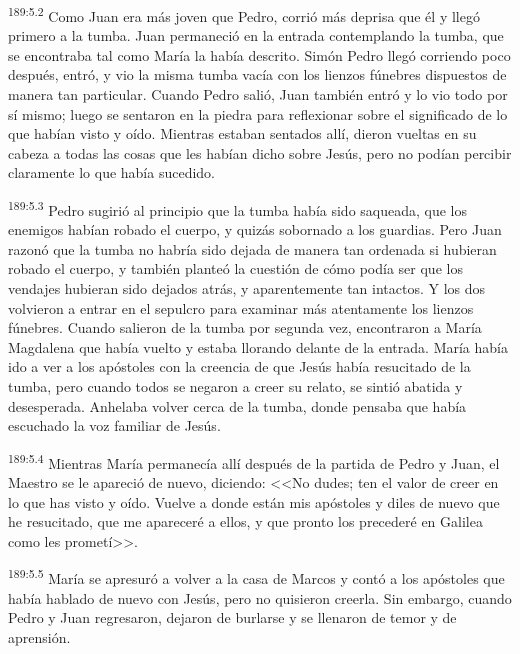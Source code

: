 \par 
\textsuperscript{189:5.2} Como Juan era más joven que Pedro, corrió más deprisa que él y llegó primero a la tumba. Juan permaneció en la entrada contemplando la tumba, que se encontraba tal como María la había descrito. Simón Pedro llegó corriendo poco después, entró, y vio la misma tumba vacía con los lienzos fúnebres dispuestos de manera tan particular. Cuando Pedro salió, Juan también entró y lo vio todo por sí mismo; luego se sentaron en la piedra para reflexionar sobre el significado de lo que habían visto y oído. Mientras estaban sentados allí, dieron vueltas en su cabeza a todas las cosas que les habían dicho sobre Jesús, pero no podían percibir claramente lo que había sucedido.

\par 
\textsuperscript{189:5.3} Pedro sugirió al principio que la tumba había sido saqueada, que los enemigos habían robado el cuerpo, y quizás sobornado a los guardias. Pero Juan razonó que la tumba no habría sido dejada de manera tan ordenada si hubieran robado el cuerpo, y también planteó la cuestión de cómo podía ser que los vendajes hubieran sido dejados atrás, y aparentemente tan intactos. Y los dos volvieron a entrar en el sepulcro para examinar más atentamente los lienzos fúnebres. Cuando salieron de la tumba por segunda vez, encontraron a María Magdalena que había vuelto y estaba llorando delante de la entrada. María había ido a ver a los apóstoles con la creencia de que Jesús había resucitado de la tumba, pero cuando todos se negaron a creer su relato, se sintió abatida y desesperada. Anhelaba volver cerca de la tumba, donde pensaba que había escuchado la voz familiar de Jesús.

\par 
\textsuperscript{189:5.4} Mientras María permanecía allí después de la partida de Pedro y Juan, el Maestro se le apareció de nuevo, diciendo: <<No dudes; ten el valor de creer en lo que has visto y oído. Vuelve a donde están mis apóstoles y diles de nuevo que he resucitado, que me apareceré a ellos, y que pronto los precederé en Galilea como les prometí>>.

\par 
\textsuperscript{189:5.5} María se apresuró a volver a la casa de Marcos y contó a los apóstoles que había hablado de nuevo con Jesús, pero no quisieron creerla. Sin embargo, cuando Pedro y Juan regresaron, dejaron de burlarse y se llenaron de temor y de aprensión.